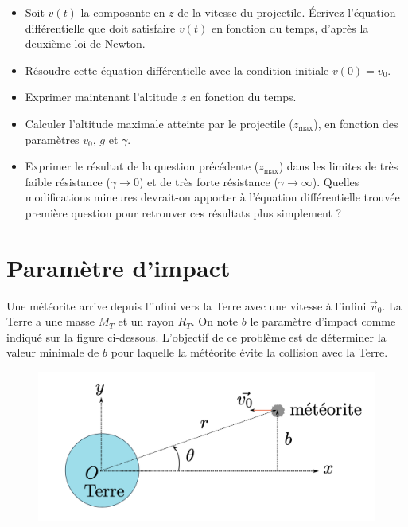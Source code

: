\documentclass{report}
\begin{document}
\begin{itemize}
\item Soit $v(t)$ la composante en $z$ de la vitesse du projectile. \'{E}crivez l'équation différentielle que doit satisfaire $v(t)$ en fonction du temps, d'après la deuxième loi de Newton.
\item Résoudre cette équation différentielle avec la condition initiale $v(0)=v_0$.
\item Exprimer maintenant l'altitude $z$ en fonction du temps.
\item Calculer l'altitude maximale atteinte par le projectile ($z_\mathrm{max}$), en fonction des paramètres $v_0$, $g$ et $\gamma$.
\item Exprimer le résultat de la question précédente ($z_\mathrm{max}$) dans les limites de très faible résistance ($\gamma \rightarrow 0$) et de très forte résistance ($\gamma \rightarrow \infty$). Quelles modifications mineures devrait-on apporter à l'équation différentielle trouvée première question pour retrouver ces résultats plus simplement ?

\end{itemize}

\newpage

\section*{Paramètre d'impact}

Une météorite arrive depuis l'infini vers la Terre avec une vitesse à l'infini $\vec{v}_0$. La Terre a une masse $M_T$ et un rayon $R_T$. On note $b$ le paramètre d'impact comme indiqué sur la figure ci-dessous. L'objectif de ce problème est de déterminer la valeur minimale de $b$ pour laquelle la météorite évite la collision avec la Terre.

\begin{figure}[h]
\centering
  \includegraphics[scale=0.4]{parametre_impact.png}
\end{figure}
\end{document}
